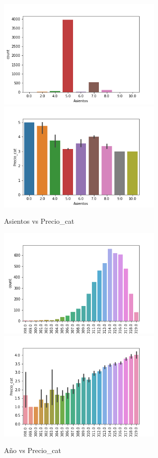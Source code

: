 \documentclass[12pt,twoside]{report}
\begin{document}
\begin{figure}[H]
\begin{multicols}{2}
\includegraphics[width=8cm]{../notebooks/figures/asientos.png}
\columnbreak
\includegraphics[width=8cm]{../notebooks/figures/asientos_precio_cat.png}
\end{multicols}
\caption{Asientos vs Precio\_cat}
\label{fig:eda_discretes}
\end{figure}


\begin{figure}[H]
\begin{multicols}{2}
\includegraphics[width=8cm]{../notebooks/figures/anio.png}
\columnbreak
\includegraphics[width=8cm]{../notebooks/figures/anio_precio_cat.png}
\end{multicols}
\caption{Año vs Precio\_cat}
\label{fig:eda_anio_precio}
\end{figure}
\end{document}
